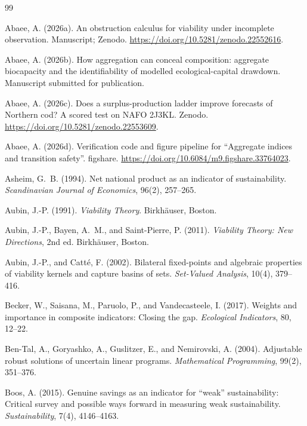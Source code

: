 \begin{thebibliography}{99}
\makeatletter\renewcommand{\@biblabel}[1]{}\makeatother

 Abaee, A. (2026a). An obstruction calculus for viability under incomplete observation. Manuscript; Zenodo. \url{https://doi.org/10.5281/zenodo.22552616}.

 Abaee, A. (2026b). How aggregation can conceal composition: aggregate biocapacity and the identifiability of modelled ecological-capital drawdown. Manuscript submitted for publication.

 Abaee, A. (2026c). Does a surplus-production ladder improve forecasts of Northern cod? A scored test on NAFO 2J3KL. Zenodo. \url{https://doi.org/10.5281/zenodo.22553609}.

 Abaee, A. (2026d). Verification code and figure pipeline for ``Aggregate indices and transition safety''. figshare. \url{https://doi.org/10.6084/m9.figshare.33764023}.

 Asheim, G.~B. (1994). Net national product as an indicator of sustainability. \emph{Scandinavian Journal of Economics}, 96(2), 257--265.

 Aubin, J.-P. (1991). \emph{Viability Theory}. Birkh\"auser, Boston.

 Aubin, J.-P., Bayen, A.~M., and Saint-Pierre, P. (2011). \emph{Viability Theory: New Directions}, 2nd ed. Birkh\"auser, Boston.

 Aubin, J.-P., and Catt\'e, F. (2002). Bilateral fixed-points and algebraic properties of viability kernels and capture basins of sets. \emph{Set-Valued Analysis}, 10(4), 379--416.

 Becker, W., Saisana, M., Paruolo, P., and Vandecasteele, I. (2017). Weights and importance in composite indicators: Closing the gap. \emph{Ecological Indicators}, 80, 12--22.

 Ben-Tal, A., Goryashko, A., Guslitzer, E., and Nemirovski, A. (2004). Adjustable robust solutions of uncertain linear programs. \emph{Mathematical Programming}, 99(2), 351--376.

 Boos, A. (2015). Genuine savings as an indicator for ``weak'' sustainability: Critical survey and possible ways forward in measuring weak sustainability. \emph{Sustainability}, 7(4), 4146--4163.


\end{thebibliography}
